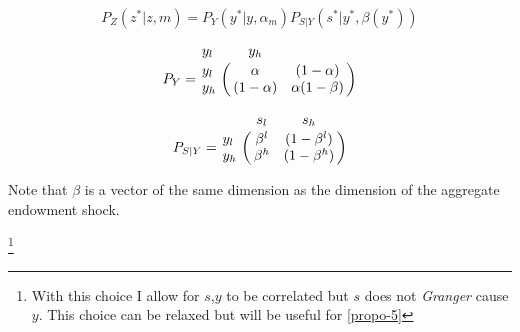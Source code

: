 \documentclass[12pt]{article}
\begin{document}
\begin{equation}
\label{mat:Pz}
P_Z(z^*|z,m)=P_{Y} (y^*|y,\alpha_m)P_{S|Y} (s^*|y^*,\beta (y^*)) 
\end{equation}

\[P_Y=\bordermatrix{\text{}y_l&y_h\cr
                y_l&\alpha  & (1-\alpha)\cr
                y_h&   (1-\alpha) &   \alpha(1-\beta)}\]
                
\[P_{S|Y}=\bordermatrix{\text{}&s_l&s_h\cr
                y_l& \beta^l & (1-\beta^l)\cr
                y_h&   \beta^h & (1-\beta^h)}\]
                
Note that $\beta$ is a vector of the same dimension as the dimension of the aggregate endowment shock.

\footnote{With this choice I allow for $s$,$y$ to be correlated but $s$ does not \emph{Granger} cause $y$. This choice can be relaxed but will be useful for \ref{propo-5}}

%
\end{document}
